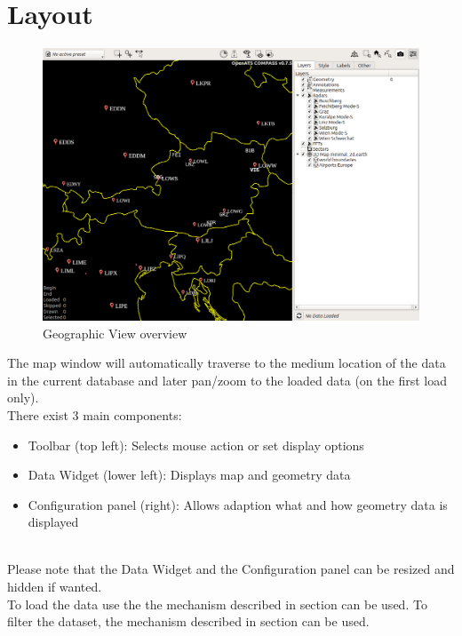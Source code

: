 \section{Layout}

\begin{figure}[H]
    \hspace*{-2.5cm}
    \includegraphics[width=19cm,frame]{figures/geoview_overview.png}
  \caption{Geographic View overview}
  \label{fig:geoview_overview}
\end{figure}

The map window will automatically traverse to the medium location of the data in the current database and later pan/zoom to the loaded data (on the first load only). \\

There exist 3 main components:
\begin{itemize}
 \item Toolbar (top left): Selects mouse action or set display options
 \item Data Widget (lower left): Displays map and geometry data
 \item Configuration panel (right): Allows adaption what and how geometry data is displayed
\end{itemize}
\ \\

Please note that the Data Widget and the Configuration panel can be resized and hidden if wanted. \\

To load the data use the the mechanism described in section  can be used. To filter the dataset, the mechanism described in section  can be used. \\

